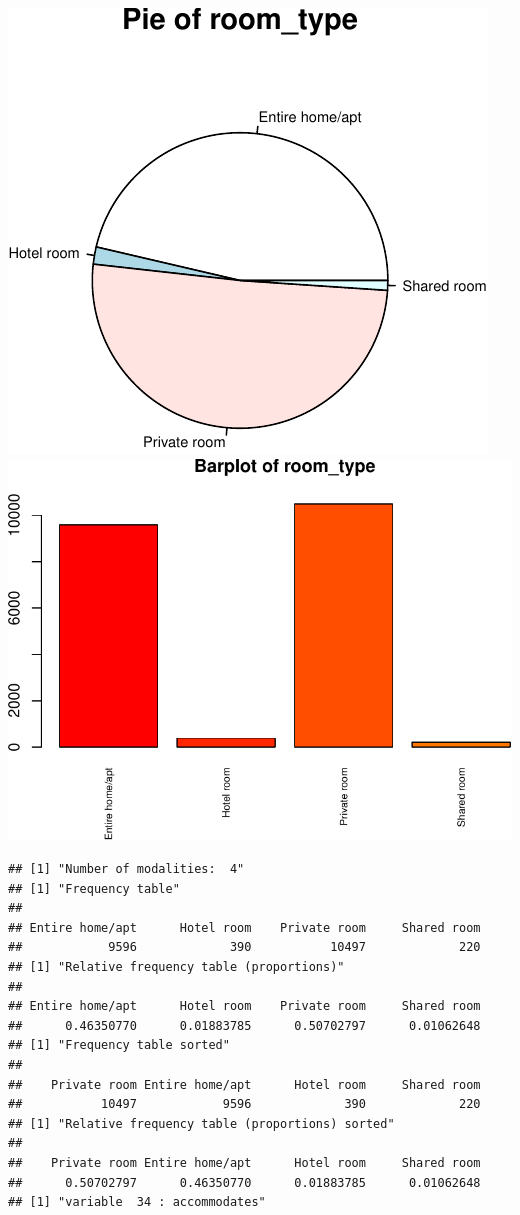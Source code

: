 \includegraphics{anal_files/figure-latex/unnamed-chunk-7-18.pdf}
\includegraphics{anal_files/figure-latex/unnamed-chunk-7-19.pdf}

\begin{verbatim}
## [1] "Number of modalities:  4"
## [1] "Frequency table"
## 
## Entire home/apt      Hotel room    Private room     Shared room 
##            9596             390           10497             220 
## [1] "Relative frequency table (proportions)"
## 
## Entire home/apt      Hotel room    Private room     Shared room 
##      0.46350770      0.01883785      0.50702797      0.01062648 
## [1] "Frequency table sorted"
## 
##    Private room Entire home/apt      Hotel room     Shared room 
##           10497            9596             390             220 
## [1] "Relative frequency table (proportions) sorted"
## 
##    Private room Entire home/apt      Hotel room     Shared room 
##      0.50702797      0.46350770      0.01883785      0.01062648 
## [1] "variable  34 : accommodates"
\end{verbatim}

